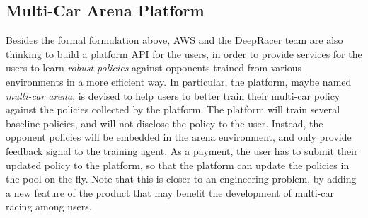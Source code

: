 

 

\subsection{Multi-Car Arena Platform}\label{sec:platform} 

Besides the formal formulation above, AWS and the DeepRacer team are also thinking to build a platform API for the users, in order to provide services for the users to learn  \emph{robust policies} against opponents trained from various environments in a more efficient way. In particular, the platform, maybe named   \emph{multi-car arena}, is devised to help users to better train their multi-car policy against the policies collected by the platform. The platform will train several baseline policies, and will not disclose the policy to the user. Instead, the opponent policies will be embedded in the arena environment, and only provide feedback signal to the training agent.  As a payment, the user has to submit their updated policy to the platform, so that the platform can update the policies in the pool on the fly. 
Note that this is closer to an engineering problem, by adding a new feature of the product that may benefit the development of multi-car racing among users. 





